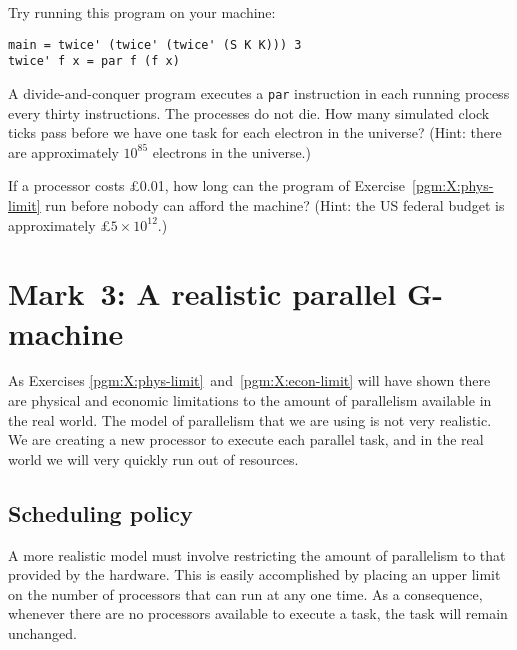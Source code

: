 \begin{exercise}\label{pgm:X:run2}
Try running this program on your machine:
\begin{verbatim}
main = twice' (twice' (twice' (S K K))) 3
twice' f x = par f (f x)
\end{verbatim}
\end{exercise}

\begin{exercise}\label{pgm:X:phys-limit}
A divide-and-conquer program executes a \mbox{\tt par} instruction in each
running process every thirty instructions. The processes do not die.
How many simulated clock ticks pass before we have one task for
each electron in the universe? (Hint: there are approximately $10^{85}$
electrons in the universe.)
\end{exercise}

\begin{exercise}\label{pgm:X:econ-limit}
If a processor costs \pounds 0.01, how long can the program of
Exercise~\ref{pgm:X:phys-limit} run before nobody can
afford the machine? (Hint: the US federal budget is approximately
\pounds $5\times10^{12}$.)
\end{exercise}

\section{Mark~3: A realistic parallel G-machine}
\label{pgm:sc:mark3}

As Exercises \ref{pgm:X:phys-limit}~and~\ref{pgm:X:econ-limit} will
have shown there are physical and economic limitations to the amount
of parallelism available in the real world. The model of parallelism that we are using is not very
realistic. We are creating a new processor to execute each parallel
task, and in the real world we will very quickly run out of resources.

\subsection{Scheduling policy}

A more realistic model must involve restricting the amount of
parallelism to that provided by the hardware. This is easily
accomplished by placing an upper limit on the number of processors
that can run at any one time. As a consequence, whenever there are no
processors available to execute a task, the task will remain unchanged.

